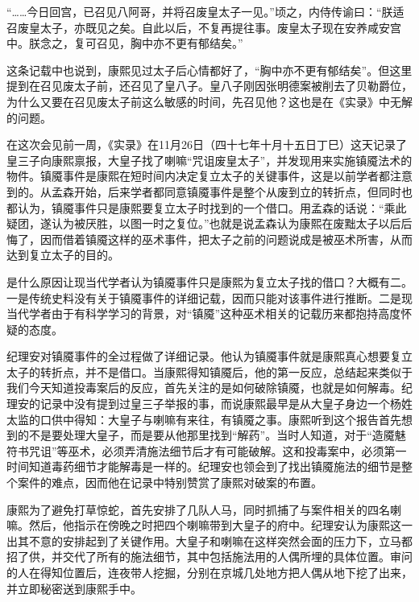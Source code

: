 
\begin{bookquote}“……今日回宫，已召见八阿哥，并将召废皇太子一见。”顷之，内侍传谕曰：“朕适召废皇太子，亦既见之矣。自此以后，不复再提往事。废皇太子现在安养咸安宫中。朕念之，复可召见，胸中亦不更有郁结矣。”\end{bookquote}


这条记载中也说到，康熙见过太子后心情都好了，“胸中亦不更有郁结矣”。但这里提到在召见废太子前，还召见了皇八子。皇八子刚因张明德案被削去了贝勒爵位，为什么又要在召见废太子前这么敏感的时间，先召见他？这也是在《实录》中无解的问题。



在这次会见前一周，《实录》在11月26日（四十七年十月十五日丁巳）这天记录了皇三子向康熙禀报，大皇子找了喇嘛“咒诅废皇太子”，并发现用来实施镇魇法术的物件。镇魇事件是康熙在短时间内决定复立太子的关键事件，这是以前学者都注意到的。从孟森开始，后来学者都同意镇魇事件是整个从废到立的转折点，但同时也都认为，镇魇事件只是康熙要复立太子时找到的一个借口。用孟森的话说：“乘此疑团，遂认为被厌胜，以图一时之复位。”也就是说孟森认为康熙在废黜太子以后后悔了，因而借着镇魇这样的巫术事件，把太子之前的问题说成是被巫术所害，从而达到复立太子的目的。



是什么原因让现当代学者认为镇魇事件只是康熙为复立太子找的借口？大概有二。一是传统史料没有关于镇魇事件的详细记载，因而只能对该事件进行推断。二是现当代学者由于有科学学习的背景，对“镇魇”这种巫术相关的记载历来都抱持高度怀疑的态度。



纪理安对镇魇事件的全过程做了详细记录。他认为镇魇事件就是康熙真心想要复立太子的转折点，并不是借口。当康熙得知镇魇后，他的第一反应，总结起来类似于我们今天知道投毒案后的反应，首先关注的是如何破除镇魇，也就是如何解毒。纪理安的记录中没有提到过皇三子举报的事，而说康熙最早是从大皇子身边一个杨姓太监的口供中得知：大皇子与喇嘛有来往，有镇魇之事。康熙听到这个报告首先想到的不是要处理大皇子，而是要从他那里找到“解药”。当时人知道，对于“造魇魅符书咒诅”等巫术，必须弄清施法细节后才有可能破解。这和投毒案中，必须第一时间知道毒药细节才能解毒是一样的。纪理安也领会到了找出镇魇施法的细节是整个案件的难点，因而他在记录中特别赞赏了康熙对破案的布置。



康熙为了避免打草惊蛇，首先安排了几队人马，同时抓捕了与案件相关的四名喇嘛。然后，他指示在傍晚之时把四个喇嘛带到大皇子的府中。纪理安认为康熙这一出其不意的安排起到了关键作用。大皇子和喇嘛在这样突然会面的压力下，立马都招了供，并交代了所有的施法细节，其中包括施法用的人偶所埋的具体位置。审问的人在得知位置后，连夜带人挖掘，分别在京城几处地方把人偶从地下挖了出来，并立即秘密送到康熙手中。


